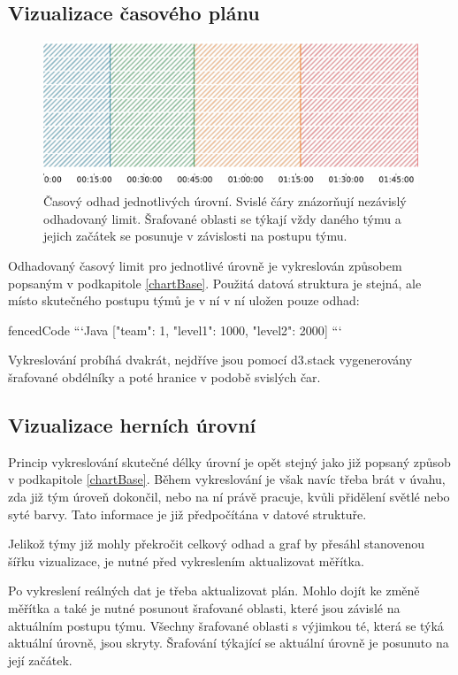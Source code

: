\documentclass[
  digital, %
  oneside, %
  table,   %
  nolof,     %
  nolot,     %
]{fithesis3}
\begin{document}
\subsection{Vizualizace časového plánu}
\begin{figure}[H]
  \begin{center}
    \includegraphics[width=12.7cm]{images/ctf-plan.pdf}
  \end{center}
  \caption{Časový odhad jednotlivých úrovní. Svislé čáry znázorňují nezávislý odhadovaný limit. Šrafované oblasti se týkají vždy daného týmu a jejich začátek se posunuje v závislosti na postupu týmu.}
  \label{fig:visualizationChart}
\end{figure}
Odhadovaný časový limit pro jednotlivé úrovně je vykreslován způsobem popsaným v podkapitole \ref{chartBase}. Použitá datová struktura je stejná, ale místo skutečného postupu týmů je v ní v ní uložen pouze odhad:
\begin{markdown*}{
  fencedCode
}
```Java
[{"team": 1, "level1": 1000, "level2": 2000}]
```
\end{markdown*}
Vykreslování probíhá dvakrát, nejdříve jsou pomocí d3.stack vygenerovány šrafované obdélníky a poté hranice v podobě svislých čar.

\subsection{Vizualizace herních úrovní}
Princip vykreslování skutečné délky úrovní je opět stejný jako již popsaný způsob v podkapitole \ref{chartBase}. Během vykreslování je však navíc třeba brát v úvahu, zda již tým úroveň dokončil, nebo na ní právě pracuje, kvůli přidělení světlé nebo syté barvy. Tato informace je již předpočítána v datové struktuře.\par
Jelikož týmy již mohly překročit celkový odhad a graf by přesáhl stanovenou šířku vizualizace, je nutné před vykreslením aktualizovat měřítka.\par
Po vykreslení reálných dat je třeba aktualizovat plán. Mohlo dojít ke změně měřítka a také je nutné posunout šrafované oblasti, které jsou závislé na aktuálním postupu týmu. Všechny šrafované oblasti s výjimkou té, která se týká aktuální úrovně, jsou skryty. Šrafování týkající se aktuální úrovně je posunuto na její začátek.
\end{document}
